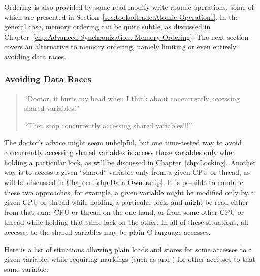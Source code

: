 Ordering is also provided by some read-modify-write atomic
operations, some of which are presented in
Section~\ref{sec:toolsoftrade:Atomic Operations}.
In the general case, memory ordering can be quite subtle, as
discussed in
Chapter~\ref{chp:Advanced Synchronization: Memory Ordering}.
The next section covers an alternative to memory ordering, namely
limiting or even entirely avoiding data races.

\subsubsection{Avoiding Data Races}
\label{sec:toolsoftrade:Avoiding Data Races}

\begin{quote}
``Doctor, it hurts my head when I think about concurrently accessing
shared variables!''

``Then stop concurrently accessing shared variables!!!''
\end{quote}

The doctor's advice might seem unhelpful, but
one time-tested way to avoid concurrently accessing shared variables
is access those variables only when holding a particular lock, as will
be discussed in Chapter~\ref{chp:Locking}.
Another way is to access a given ``shared'' variable only from a given
CPU or thread, as will be discussed in
Chapter~\ref{chp:Data Ownership}.
It is possible to combine these two approaches, for example, a given
variable might be modified only by a given CPU or thread while holding a
particular lock, and might be read either from that same CPU or thread
on the one hand, or from some other CPU or thread while holding that
same lock on the other.
In all of these situations, all accesses to the shared variables may
be plain C-language accesses.

Here is a list of situations
allowing plain loads and stores for some accesses to a given variable,
while requiring markings (such as  and )
for other accesses to that same variable:

